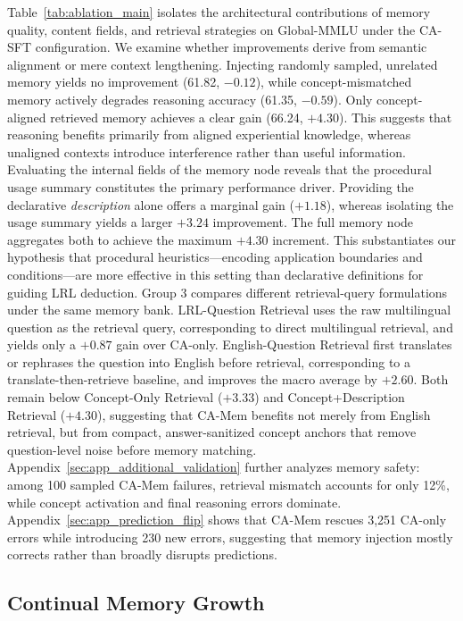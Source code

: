 \documentclass[11pt]{article}
\begin{document}
Table~\ref{tab:ablation_main} isolates the architectural contributions of memory quality, content fields, and retrieval strategies on Global-MMLU under the CA-SFT configuration.
We examine whether improvements derive from semantic alignment or mere context lengthening.
Injecting randomly sampled, unrelated memory yields no improvement (61.82, $-0.12$), while concept-mismatched memory actively degrades reasoning accuracy (61.35, $-0.59$).
Only concept-aligned retrieved memory achieves a clear gain (66.24, $+4.30$).
This suggests that reasoning benefits primarily from aligned experiential knowledge, whereas unaligned contexts introduce interference rather than useful information.
Evaluating the internal fields of the memory node reveals that the procedural usage summary constitutes the primary performance driver.
Providing the declarative \textit{description} alone offers a marginal gain ($+1.18$), whereas isolating the usage summary yields a larger $+3.24$ improvement.
The full memory node aggregates both to achieve the maximum $+4.30$ increment.
This substantiates our hypothesis that procedural heuristics---encoding application boundaries and conditions---are more effective in this setting than declarative definitions for guiding LRL deduction.
Group 3 compares different retrieval-query formulations under the same memory bank.
LRL-Question Retrieval uses the raw multilingual question as the retrieval query, corresponding to direct multilingual retrieval, and yields only a $+0.87$ gain over CA-only.
English-Question Retrieval first translates or rephrases the question into English before retrieval, corresponding to a translate-then-retrieve baseline, and improves the macro average by $+2.60$.
Both remain below Concept-Only Retrieval ($+3.33$) and Concept+Description Retrieval ($+4.30$), suggesting that CA-Mem benefits not merely from English retrieval, but from compact, answer-sanitized concept anchors that remove question-level noise before memory matching.
Appendix~\ref{sec:app_additional_validation} further analyzes memory safety: among 100 sampled CA-Mem failures, retrieval mismatch accounts for only 12\%, while concept activation and final reasoning errors dominate. Appendix~\ref{sec:app_prediction_flip} shows that CA-Mem rescues 3,251 CA-only errors while introducing 230 new errors, suggesting that memory injection mostly corrects rather than broadly disrupts predictions.

\subsection{Continual Memory Growth}
\end{document}
